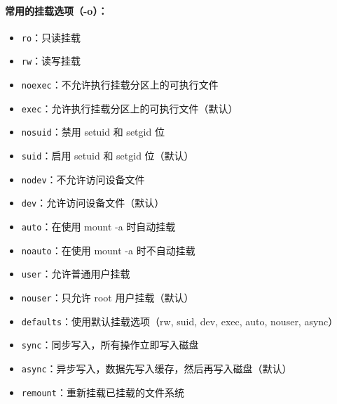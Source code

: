\documentclass[12pt,UTF8]{ctexbook}
\begin{document}
\paragraph{常用的挂载选项（-o）：}
\begin{itemize}
    \item \verb+ro+：只读挂载
    \item \verb+rw+：读写挂载
    \item \verb+noexec+：不允许执行挂载分区上的可执行文件
    \item \verb+exec+：允许执行挂载分区上的可执行文件（默认）
    \item \verb+nosuid+：禁用 setuid 和 setgid 位
    \item \verb+suid+：启用 setuid 和 setgid 位（默认）
    \item \verb+nodev+：不允许访问设备文件
    \item \verb+dev+：允许访问设备文件（默认）
    \item \verb+auto+：在使用 mount -a 时自动挂载
    \item \verb+noauto+：在使用 mount -a 时不自动挂载
    \item \verb+user+：允许普通用户挂载
    \item \verb+nouser+：只允许 root 用户挂载（默认）
    \item \verb+defaults+：使用默认挂载选项（rw, suid, dev, exec, auto, nouser, async）
    \item \verb+sync+：同步写入，所有操作立即写入磁盘
    \item \verb+async+：异步写入，数据先写入缓存，然后再写入磁盘（默认）
    \item \verb+remount+：重新挂载已挂载的文件系统
\end{itemize}
\end{document}
